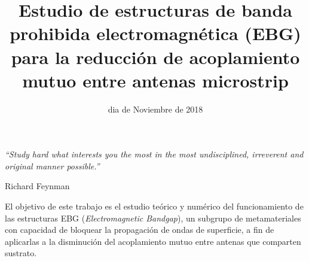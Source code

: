 \documentclass[a4paper, 11pt, twoside]{Thesis}  %
\begin{document}


\frontmatter  %

\title  {Estudio de estructuras de banda prohibida electromagnética (EBG) para la reducción de acoplamiento mutuo entre antenas microstrip}  %
\addresses  {\groupname\\\deptname\\\univname}  %
\date{dia de Noviembre de 2018}  %
\subject{}
\keywords{}
\maketitle


\fancyhead{}  %
\rhead{\thepage}  %
\lhead{}  %




\pagestyle{empty}
\null\vfill
\textit{\enquote{Study hard what interests you the most in the most undisciplined, irreverent and original manner possible.}}
\begin{flushright}
Richard Feynman
\end{flushright}
\clearpage

\clearpage\pagestyle{empty}\mbox{}\clearpage  %




\pagestyle{empty}


\abstract

El objetivo de este trabajo es el estudio teórico y numérico del funcionamiento de las estructuras EBG (\textit{Electromagnetic Bandgap}), un subgrupo de metamateriales con capacidad de bloquear la propagación de ondas de superficie, a fin de aplicarlas a la disminución del acoplamiento mutuo entre antenas que comparten sustrato.
\end{document}
